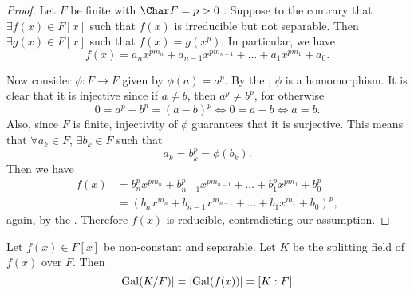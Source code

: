 \documentclass[notoc,notitlepage,nobib]{tufte-book}
\DeclareMathOperator{\Gal}{Gal}
\begin{document}
\begin{proof}
  Let $F$ be finite with $\Char F = p > 0$ . Suppose
  to the contrary that $\exists f(x) \in F[x]$ such that $f(x)$ is irreducible
  but not separable. Then $\exists g(x) \in F[x]$ such that $f(x) = g(x^p)$. In
  particular, we have
  \begin{equation*}
    f(x) = a_n x^{p m_n} + a_{n - 1} x^{p m_{n - 1}} + \hdots + a_1 x^{p m_1} +
    a_0.
  \end{equation*}

  Now consider $\phi : F \to F$ given by $\phi(a) = a^p$. By the
  , $\phi$ is a homomorphism. It is clear that it is
  injective since if $a \neq b$, then $a^p \neq b^p$, for otherwise
  \begin{equation*}
    0 = a^p - b^p = (a - b)^p \iff 0 = a - b \iff a = b.
  \end{equation*}
  Also, since $F$ is finite, injectivity of $\phi$ guarantees that it is
  surjective. This means that $\forall a_k \in F$, $\exists b_k \in F$ such that
  \begin{equation*}
    a_k = b_k^p = \phi(b_k).
  \end{equation*}
  Then we have
  \begin{align*}
    f(x) &= b_n^p x^{p m_n} + b_{n - 1}^p x^{p m_{n - 1}} + \hdots + b_1^p x^{p
          m_1} + b_0^p \\
         &= ( b_n x^{m_n} + b_{n - 1} x^{m_{n - 1}} + \hdots + b_1 x^{m_1} + b_0
          )^p,
  \end{align*}
  again, by the . Therefore $f(x)$ is reducible,
  contradicting our assumption.
\end{proof}

\begin{thm}\label{thm:galois_group_of_a_splitting_field_of_a_separable_polynomial_has_order_the_degree_of_the_extension}
  Let $f(x) \in F[x]$ be non-constant and separable. Let $K$ be the splitting
  field of $f(x)$ over $F$. Then
  \begin{equation*}
    \abs{ \Gal(K / F) } = \abs{ \Gal(f(x)) } = [ K : F ].
  \end{equation*}
\end{thm}
\end{document}
